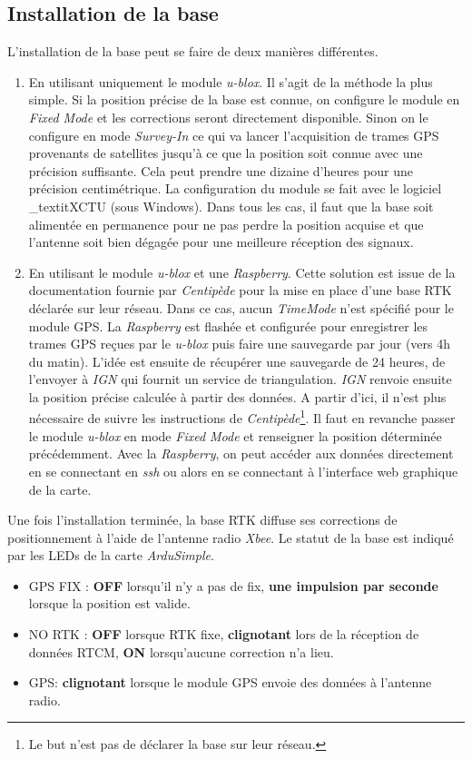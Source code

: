 \documentclass[12pt]{report}
\begin{document}
\subsection{Installation de la base}
L'installation de la base peut se faire de deux manières différentes. 
\begin{enumerate}
    \item En utilisant uniquement le module \textit{u-blox}. Il s'agit de la méthode la plus simple. Si la position précise de la base est connue, on configure le module en \textit{Fixed Mode} et les corrections seront directement disponible. 
    Sinon on le configure en mode \textit{Survey-In} ce qui va lancer l'acquisition de trames GPS provenants de satellites jusqu'à ce que la position soit connue avec une précision suffisante. Cela peut prendre une dizaine d'heures pour une précision centimétrique.
    La configuration du module se fait avec le logiciel _textit{XCTU} (sous Windows). Dans tous les cas, il faut que la base soit alimentée en permanence pour ne pas perdre la position acquise et que l'antenne soit bien dégagée pour une meilleure réception des signaux.
    \item En utilisant le module \textit{u-blox} et une \textit{Raspberry}. Cette solution est issue de la documentation fournie par \textit{Centipède} pour la mise en place d'une base RTK déclarée sur leur réseau. 
    Dans ce cas, aucun \textit{TimeMode} n'est spécifié pour le module GPS. La \textit{Raspberry} est flashée et configurée pour enregistrer les trames GPS reçues par le \textit{u-blox} puis faire une sauvegarde par jour (vers 4h du matin). 
    L'idée est ensuite de récupérer une sauvegarde de 24 heures, de l'envoyer à \textit{IGN} qui fournit un service de triangulation. \textit{IGN} renvoie ensuite la position précise calculée à partir des données. 
    A partir d'ici, il n'est plus nécessaire de suivre les instructions de \textit{Centipède}\footnote{Le but n'est pas de déclarer la base sur leur réseau.}. Il faut en revanche passer le module \textit{u-blox} en mode \textit{Fixed Mode} et renseigner la position déterminée précédemment. 
    Avec la \textit{Raspberry}, on peut accéder aux données directement en se connectant en \textit{ssh} ou alors en se connectant à l'interface web graphique de la carte.
\end{enumerate}

Une fois l'installation terminée, la base RTK diffuse ses corrections de positionnement à l'aide de l'antenne radio \textit{Xbee}. Le statut de la base est indiqué par les LEDs de la carte \textit{ArduSimple}.
\begin{itemize}
    \item GPS FIX : \textbf{OFF} lorsqu'il n'y a pas de fix, \textbf{une impulsion par seconde} lorsque la position est valide.
    \item NO RTK : \textbf{OFF} lorsque RTK fixe, \textbf{clignotant} lors de la réception de données RTCM, \textbf{ON} lorsqu'aucune correction n'a lieu. 
    \item GPS\rightarrowXBEE : \textbf{clignotant} lorsque le module GPS envoie des données à l'antenne radio.
\end{itemize}
\end{document}
